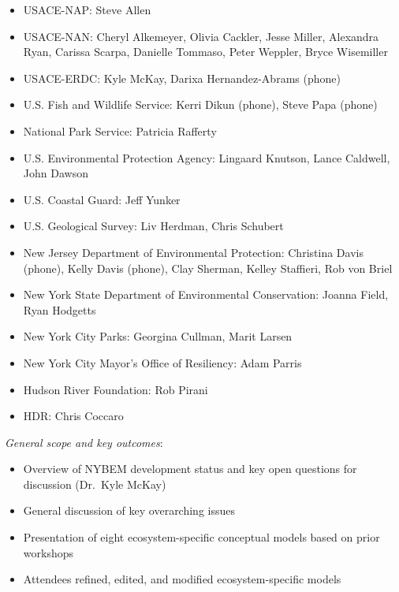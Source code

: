 \documentclass[
]{book}
\providecommand{\tightlist}{%
  \setlength{\itemsep}{0pt}\setlength{\parskip}{0pt}}
\begin{document}
\begin{itemize}
\tightlist
\item
  USACE-NAP: Steve Allen\\
\item
  USACE-NAN: Cheryl Alkemeyer, Olivia Cackler, Jesse Miller, Alexandra Ryan, Carissa Scarpa, Danielle Tommaso, Peter Weppler, Bryce Wisemiller\\
\item
  USACE-ERDC: Kyle McKay, Darixa Hernandez-Abrams (phone)\\
\item
  U.S. Fish and Wildlife Service: Kerri Dikun (phone), Steve Papa (phone)\\
\item
  National Park Service: Patricia Rafferty\\
\item
  U.S. Environmental Protection Agency: Lingaard Knutson, Lance Caldwell, John Dawson\\
\item
  U.S. Coastal Guard: Jeff Yunker\\
\item
  U.S. Geological Survey: Liv Herdman, Chris Schubert\\
\item
  New Jersey Department of Environmental Protection: Christina Davis (phone), Kelly Davis (phone), Clay Sherman, Kelley Staffieri, Rob von Briel\\
\item
  New York State Department of Environmental Conservation: Joanna Field, Ryan Hodgetts
\item
  New York City Parks: Georgina Cullman, Marit Larsen\\
\item
  New York City Mayor's Office of Resiliency: Adam Parris\\
\item
  Hudson River Foundation: Rob Pirani\\
\item
  HDR: Chris Coccaro
\end{itemize}

\emph{General scope and key outcomes}:

\begin{itemize}
\tightlist
\item
  Overview of NYBEM development status and key open questions for discussion (Dr.~Kyle McKay)\\
\item
  General discussion of key overarching issues\\
\item
  Presentation of eight ecosystem-specific conceptual models based on prior workshops\\
\item
  Attendees refined, edited, and modified ecosystem-specific models
\end{itemize}
\end{document}
